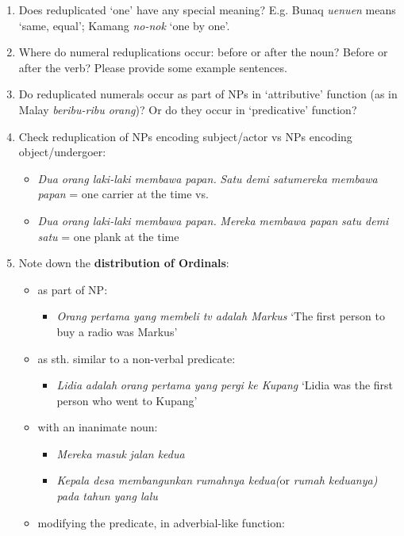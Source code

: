 \begin{enumerate}
\item Does reduplicated `one' have any special meaning? E.g. Bunaq \textit{uen{\Tilde}uen} means `same, equal'; Kamang \textit{no-nok} `one by one'.
\item Where do numeral reduplications occur: before or after the noun? Before or after the verb? Please provide some example sentences.
\item Do reduplicated numerals occur as part of NPs in `attributive' function (as in Malay \textit{beribu-ribu orang})? Or do they occur in `predicative' function? 
\item  Check reduplication of NPs encoding subject/actor vs NPs encoding object/undergoer: 
\begin{itemize}
\item \textit{Dua orang laki-laki membawa papan.} \textit{Satu demi satu}\textit{mereka membawa papan} = one carrier at the time vs. 
\item \textit{Dua orang laki-laki membawa papan.} \textit{Mereka membawa papan} \textit{satu demi satu} = one plank at the time
\end{itemize}
\item  Note down the \textbf{distribution of Ordinals}: 
\begin{itemize}
\item as part of NP: 
\begin{itemize}
\item \textit{Orang pertama yang membeli tv adalah Markus} `The first person to buy a radio was Markus'  
\end{itemize}
\item as sth. similar to a non-verbal predicate: 
\begin{itemize}
\item \textit{Lidia} \textit{adalah} \textit{orang pertama yang pergi ke Kupang} `Lidia was the first person who went to Kupang' 
\end{itemize}
\item with an inanimate noun: 
\begin{itemize}
\item \textit{Mereka masuk} \textit{jalan kedua}
\item \textit{Kepala desa membangunkan} \textit{rumahnya kedua}\textit{(}or \textit{rumah keduanya}\textit{) pada tahun yang lalu } 
\end{itemize}
\item modifying the predicate, in adverbial-like function: 

\end{itemize}
\end{enumerate}
